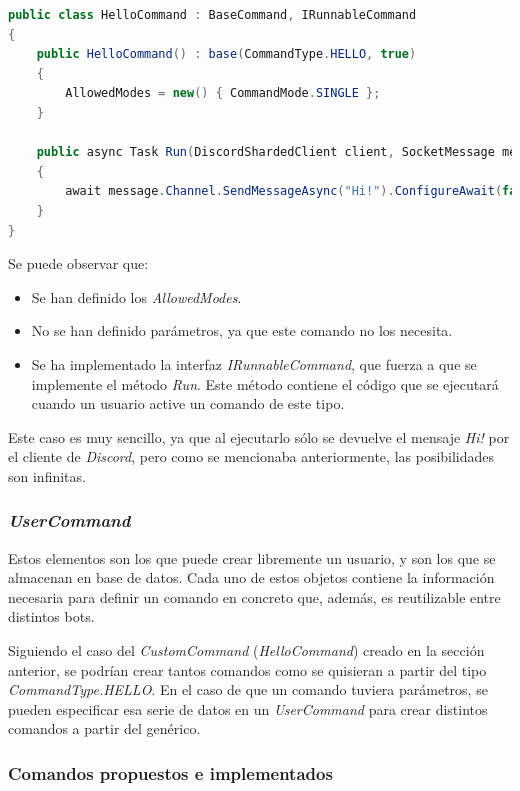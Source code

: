 \begin{lstlisting}[language=java]
public class HelloCommand : BaseCommand, IRunnableCommand
{
    public HelloCommand() : base(CommandType.HELLO, true)
    {
        AllowedModes = new() { CommandMode.SINGLE };
    }

    public async Task Run(DiscordShardedClient client, SocketMessage message, Bot botSettings, UserCommand command)
    {
        await message.Channel.SendMessageAsync("Hi!").ConfigureAwait(false);
    }
}
\end{lstlisting}

Se puede observar que:

\begin{itemize}
	\item Se han definido los \textit{AllowedModes}.
	\item No se han definido parámetros, ya que este comando no los necesita.
	\item Se ha implementado la interfaz \textit{IRunnableCommand}, que fuerza a que se implemente el método \textit{Run}. Este método contiene el código que se ejecutará cuando un usuario active un comando de este tipo.
\end{itemize}

Este caso es muy sencillo, ya que al ejecutarlo sólo se devuelve el mensaje \textit{Hi!} por el cliente de \textit{Discord}, pero como se mencionaba anteriormente, las posibilidades son infinitas.


\subsubsection{\textit{UserCommand}}

Estos elementos son los que puede crear libremente un usuario, y son los que se almacenan en base de datos. Cada uno de estos objetos contiene la información necesaria para definir un comando en concreto que, además, es reutilizable entre distintos bots.

Siguiendo el caso del \textit{CustomCommand} (\textit{HelloCommand}) creado en la sección anterior, se podrían crear tantos comandos como se quisieran a partir del tipo \textit{CommandType.HELLO}. En el caso de que un comando tuviera parámetros, se pueden especificar esa serie de datos en un \textit{UserCommand} para crear distintos comandos a partir del genérico.


\subsubsection{Comandos propuestos e implementados}

